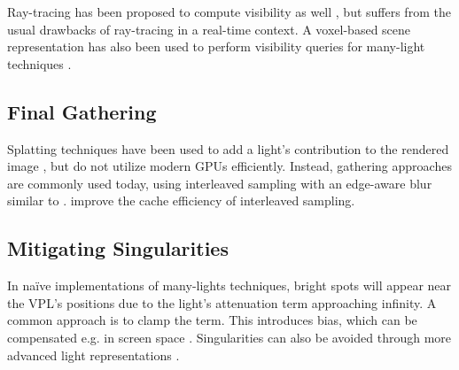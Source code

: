 Ray-tracing has been proposed to compute visibility as well \citep[e.\,g.][]{segovia2006bidirectional}, but suffers from the usual drawbacks of ray-tracing in a real-time context. A voxel-based scene representation has also been used to perform visibility queries for many-light techniques \citep{sun2015manylightsSVO}.


\subsection{Final Gathering}
\label{sec:manyLightsFinalGathering}

Splatting techniques have been used to add a light's contribution to the rendered image \citep{dachsbacher2006splatting, Nichols:2009:splatting}, but do not utilize modern GPUs efficiently. Instead, gathering approaches are commonly used today, using interleaved sampling \citep{Keller:2001:InterleavedSampling} with an edge-aware blur similar to \citep{laine2007incremental}. \cite{segovia2006non} improve the cache efficiency of interleaved sampling.


\subsection{Mitigating Singularities}
 In naïve implementations of many-lights techniques, bright spots will appear near the VPL’s positions due to the light’s attenuation term approaching infinity. A common approach is to clamp the term. This introduces bias, which can be compensated e.g. in screen space \citep{novak2011screen}. Singularities can also be avoided through more advanced light representations \citep{tokuyoshi2015vsgl}.


\cleardoublepage
